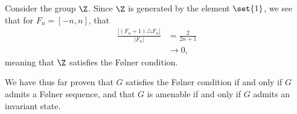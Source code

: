 \begin{example}
  Consider the group $\Z$. Since $\Z$ is generated by the element $\set{1}$, we see that for $F_n = [-n,n]$, that
  \begin{align*}
    \frac{\left\vert \left(F_n + 1\right)\triangle F_n \right\vert}{\left\vert F_n \right\vert} &= \frac{2}{2n+1}\\
                                                                                                &\rightarrow 0,
  \end{align*}
  meaning that $\Z$ satisfies the Følner condition.
\end{example}
We have thus far proven that $G$ satisfies the Følner condition if and only if $G$ admits a Følner sequence, and that $G$ is amenable if and only if $G$ admits an invariant state.\newline

